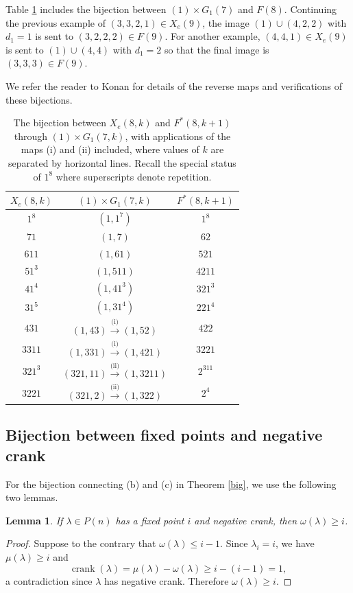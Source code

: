 \documentclass{amsart}
\theoremstyle{theorem}
\newtheorem{lemma}[theorem]{Lemma}
\theoremstyle{definition}
\DeclareMathOperator{\ck}{crank}
\begin{document}
Table \ref{tab:ab} includes the bijection between $(1) \times G_1(7)$ and $F(8)$.  Continuing the previous example of $(3,3,2,1) \in X_e(9)$, the image $(1) \cup (4,2,2)$ with $d_1 = 1$ is sent to $(3,2,2,2) \in F(9)$.  For another example, $(4,4,1) \in X_e(9)$ is sent to $(1) \cup (4,4)$ with $d_1 = 2$ so that the final image is $(3,3,3) \in F(9)$.

We refer the reader to Konan \cite{k} for details of the reverse maps and verifications of these bijections.

\begin{table}[h]
\renewcommand{\arraystretch}{1.1}
\caption{The bijection between $X_e(8,k)$ and $F^*(8,k+1)$ through $(1) \times G_1(7,k)$, with applications of the maps (i) and (ii) included, where values of $k$ are separated by horizontal lines. Recall the special status of $1^8$ where superscripts denote repetition.} \label{tab:ab}
\begin{tabular}{c|c|c}
$X_e(8,k)$ & $(1) \times G_1(7,k)$ & $F^*(8,k+1)$ \\ \hline \hline
$1^8$ & $(1,1^7)$ & $1^8$ \\ \hline
$71$ & $(1,7)$ & $62$ \\
$611$ & $(1,61)$ & $521$\\
$51^3$ & $(1,511)$ & $4211$ \\
$41^4$ & $(1,41^3)$ & $321^3$ \\
$31^5$ & $(1,31^4)$ & $221^4$ \\ \hline
$431$ & $(1,43) \overset{\text{(i)}}{\longrightarrow} (1,52)$ & $422$ \\
$3311$ & $(1,331) \overset{\text{(i)}}{\longrightarrow} (1,421)$ & $3221$  \\
$321^3$ & $(321,11) \overset{\text{(ii)}}{\longrightarrow} (1,3211)$ & $2^311$ \\ \hline
$3221$ & $(321,2) \overset{\text{(ii)}}{\longrightarrow} (1,322)$ & $2^4$
\end{tabular}
\end{table}

\subsection {Bijection between fixed points and negative crank}
For the bijection connecting (b) and (c) in Theorem \ref{big}, we use the following two lemmas.

\begin{lemma} \label{ncf}
If $\lambda \in P(n)$ has a fixed point $i$ and negative crank, then $\omega(\lambda) \ge i$.
\end{lemma}
\begin{proof}
Suppose to the contrary that $\omega(\lambda) \le i-1$.  Since $\lambda_i = i$, we have $\mu(\lambda) \ge i$ and 
\[\ck(\lambda) = \mu(\lambda) - \omega(\lambda) \ge i - (i-1) = 1,\]
a contradiction since $\lambda$ has negative crank.  Therefore $\omega(\lambda) \ge i$.
\end{proof}
\end{document}
